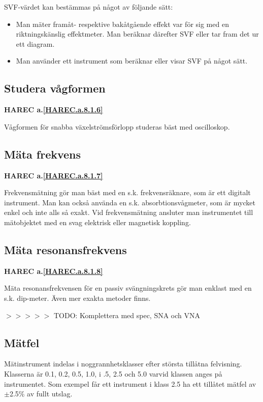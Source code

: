 SVF-värdet kan bestämmas på något av följande sätt:
\begin{itemize}
\item Man mäter framåt- respektive bakåtgående effekt var för sig med
  en riktningskänslig effektmeter. Man beräknar därefter SVF eller
  tar fram det ur ett diagram.
\item Man använder ett instrument som beräknar eller visar SVF på
  något sätt.
\end{itemize}

\subsection{Studera vågformen}
\textbf{
HAREC a.\ref{HAREC.a.8.1.6}\label{myHAREC.a.8.1.6}
}

Vågformen för snabba växelströmsförlopp studeras bäst med oscilloskop.

\subsection{Mäta frekvens}
\textbf{
HAREC a.\ref{HAREC.a.8.1.7}\label{myHAREC.a.8.1.7}
}

Frekvensmätning gör man bäst med en s.k.  frekvensräknare, som är ett
digitalt instrument.  Man kan också använda en
s.k. absorbtionsvågmeter, som är mycket enkel och inte alls så exakt.
Vid frekvensmätning ansluter man instrumentet till mätobjektet med en
svag elektrisk eller magnetisk koppling.

\subsection{Mäta resonansfrekvens}
\textbf{
HAREC a.\ref{HAREC.a.8.1.8}\label{myHAREC.a.8.1.8}
}

Mäta resonansfrekvensen för en passiv svängningskrets gör man enklast
med en s.k. dip-meter. Även mer exakta metoder finns.

$>>>>>$ TODO: Komplettera med spec, SNA och VNA

\subsection{Mätfel}

Mätinstrument indelas i noggrannhetsklasser efter största tillåtna
felvisning. Klasserna är 0.1, 0.2, 0.5, 1.0, i .5, 2.5 och 5.0 varvid
klassen anges på instrumentet. Som exempel får ett instrument i klass
2.5 ha ett tillåtet mätfel av \(\pm\)2.5\% av fullt utslag.

